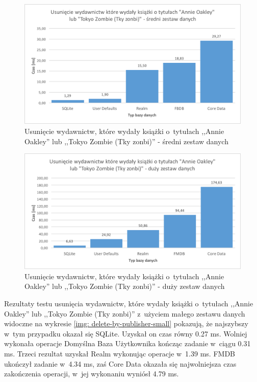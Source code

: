 \begin{figure}[H]
    \centering\includegraphics[width=\linewidth]{img/delete_data/delete_by_publisher/delete_by_publisher_medium_test.png}
    \caption{Usunięcie wydawnictw, które wydały książki o~tytułach ,,Annie Oakley'' lub ,,Tokyo Zombie (Tky zonbi)'' - średni zestaw danych}
    \label{img: delete-by-publisher-medium}
\end{figure}

\begin{figure}[H]
    \centering\includegraphics[width=\linewidth]{img/delete_data/delete_by_publisher/delete_by_publisher_big_test.png}
    \caption{Usunięcie wydawnictw, które wydały książki o~tytułach ,,Annie Oakley'' lub ,,Tokyo Zombie (Tky zonbi)'' - duży zestaw danych}
    \label{img: delete-by-publisher-big}
\end{figure}

Rezultaty testu usunięcia wydawnictw, które wydały książki o~tytułach ,,Annie Oakley'' lub ,,Tokyo Zombie (Tky zonbi)'' z~użyciem małego zestawu danych widoczne na wykresie \ref{img: delete-by-publisher-small} pokazują, że najszybszy w~tym przypadku okazał się SQLite. Uzyskał on czas równy 0.27 ms. Wolniej wykonała operacje Domyślna Baza Użytkownika kończąc zadanie w~ciągu 0.31 ms. Trzeci rezultat uzyskał Realm wykonując operacje w~1.39 ms. FMDB ukończył zadanie w~4.34 ms, zaś Core Data okazała się najwolniejsza czas zakończenia operacji, w~jej wykonaniu wyniósł 4.79 ms. 

